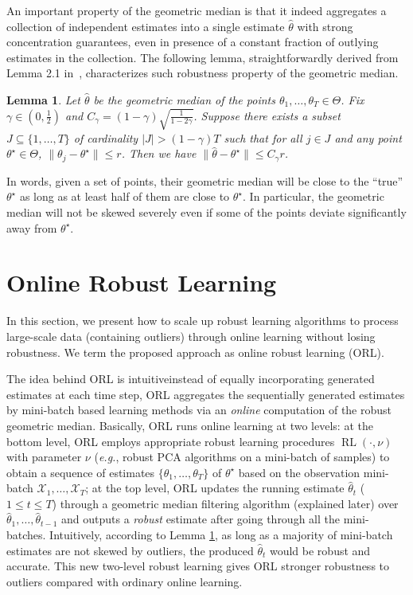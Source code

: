 \documentclass[11pt]{article}
\newtheorem{lemma}{Lemma}
\begin{document}
An important property of the geometric median is that it indeed aggregates a collection of independent estimates into a single estimate $\widehat{\theta}$ with strong concentration guarantees, even in presence of a constant fraction of outlying estimates in the collection.
The following lemma, straightforwardly derived from Lemma 2.1 in~\cite{minsker2013geometric}, characterizes such robustness property of the geometric median.
\begin{lemma}%
	\label{lemma:median}
	Let $\widehat{\theta}$ be the geometric median of the points $\theta_1,\ldots,\theta_T \in \Theta$. Fix $\gamma \in \left(0,\frac{1}{2}\right)$ and $C_\gamma = (1-\gamma)\sqrt{\frac{1}{1-2\gamma}}$. Suppose
	there exists a subset $J\subseteq \{1,\ldots,T\}$ of cardinality $|J|>(1-\gamma) T$ such that for all $j\in J$ and any point $\theta^\star\in \Theta$, $\|\theta_j -\theta^\star\| \leq r$. Then we have $\|\widehat{\theta} - \theta^\star\| \leq C_\gamma r$.
\end{lemma}
In words, given a set of points, their geometric median will be close to the ``true'' $\theta^\star$ as long as at least half of them are close to  $\theta^\star$. In particular, the geometric median will not be skewed severely even if some of the points deviate significantly away from  $\theta^\star$.

\section{Online Robust Learning}
In this section, we present how to scale up robust learning algorithms to process large-scale data (containing outliers) through online learning without losing robustness. We term the proposed approach as online robust learning (ORL).


The idea behind ORL is intuitive\textemdash instead of equally incorporating generated estimates at each time step, ORL aggregates the sequentially generated estimates by mini-batch based learning methods via an  \emph{online} computation of the robust geometric median. Basically,  ORL runs online learning at two levels: at the bottom level, ORL employs appropriate robust learning procedures $ \operatorname{RL}(\cdot, \nu) $ with parameter $\nu$ (\emph{e.g.}, robust PCA algorithms on a mini-batch of samples) to obtain a sequence of estimates $ \{\theta_1,\ldots,\theta_T\} $ of $ \theta^\star $ based on the observation mini-batch $ \mathcal{X}_1,\ldots,\mathcal{X}_T $; at the top  level, ORL updates the running estimate $ \widehat{\theta}_t $ ($1\leq t \leq T$)  through a   geometric median  filtering algorithm (explained later) over $\widehat{\theta}_1, \ldots, \widehat{\theta}_{t-1}$ and outputs a \emph{robust}  estimate after going through all the mini-batches. Intuitively, according to Lemma \ref{lemma:median}, as long as a majority of mini-batch estimates are not skewed by outliers, the produced $\widehat{\theta}_t$ would be robust and accurate. This new two-level robust learning gives ORL stronger robustness to outliers compared with ordinary  online learning.
\end{document}
